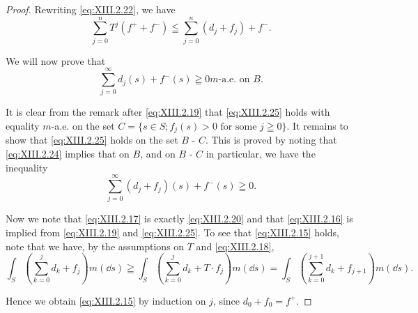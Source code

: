 \begin{proof}
Rewriting \eqref{eq:XIII.2.22}, we have 
\begin{equation}\label{eq:XIII.2.24}
\sum\limits_{j=0} ^{n} T ^{j} (f ^{+} + f ^{-}) \leqq \sum\limits_{j=0} ^{n} (d _{j} + f _{j}) + f ^{-}.
\end{equation}

We will now prove that 
\begin{equation}\label{eq:XIII.2.25}
\sum\limits_{j=0} ^{\infty} d _{j} (s) + f ^{-} (s) \geqq 0 m \text{-a.e. on } B.
\end{equation}

It is clear from the remark after \eqref{eq:XIII.2.19} that \eqref{eq:XIII.2.25} holds with equality $m$-a.e. on the set $C = \{s \in S; f_j(s) > 0 \text{ for some } j \geqq 0\}$. It remains to show that \eqref{eq:XIII.2.25} holds on the set $B$ - $C$. This is proved by noting that \eqref{eq:XIII.2.24} implies that on $B$, and on $B$ - $C$ in particular, we have the inequality 
\[
\sum\limits_{j=0} ^{\infty} \left(d _{j} + f _{j}\right) (s) + f ^{-} (s) \geqq 0.
\]

Now we note that \eqref{eq:XIII.2.17} is exactly \eqref{eq:XIII.2.20} and that \eqref{eq:XIII.2.16} is implied from \eqref{eq:XIII.2.19} and \eqref{eq:XIII.2.25}. To see that \eqref{eq:XIII.2.15} holds, note that we have, by the assumptions on $T$ and \eqref{eq:XIII.2.18}, 
\[
\int_{S} \left(\sum\limits_{k=0} ^{j} d _{k} + f _{j}\right) m (\dd s) \geqq \int_{S} \left(\sum\limits_{k=0} ^{j} d _{k} + T \cdot f _{j}\right) m (\dd s) = \int_{S} \left(\sum\limits_{k=0} ^{j+1} d _{k} + f _{j+1}\right) m (\dd s).
\]

Hence we obtain \eqref{eq:XIII.2.15} by induction on $j$, since $d_{0} + f_{0} = f^{+}$. 
\end{proof}

